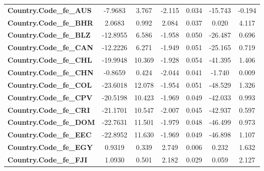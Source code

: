 \begin{center}
\begin{tabular}{lcccccc}
\textbf{Country.Code\_fe\_AUS}                            &      -7.9683  &        3.767     &    -2.115  &         0.034        &      -15.743    &       -0.194     \\
\textbf{Country.Code\_fe\_BHR}                            &       2.0683  &        0.992     &     2.084  &         0.037        &        0.020    &        4.117     \\
\textbf{Country.Code\_fe\_BLZ}                            &     -12.8955  &        6.586     &    -1.958  &         0.050        &      -26.487    &        0.696     \\
\textbf{Country.Code\_fe\_CAN}                            &     -12.2226  &        6.271     &    -1.949  &         0.051        &      -25.165    &        0.719     \\
\textbf{Country.Code\_fe\_CHL}                            &     -19.9948  &       10.369     &    -1.928  &         0.054        &      -41.395    &        1.406     \\
\textbf{Country.Code\_fe\_CHN}                            &      -0.8659  &        0.424     &    -2.044  &         0.041        &       -1.740    &        0.009     \\
\textbf{Country.Code\_fe\_COL}                            &     -23.6018  &       12.078     &    -1.954  &         0.051        &      -48.529    &        1.326     \\
\textbf{Country.Code\_fe\_CPV}                            &     -20.5198  &       10.423     &    -1.969  &         0.049        &      -42.033    &        0.993     \\
\textbf{Country.Code\_fe\_CRI}                            &     -21.1701  &       10.547     &    -2.007  &         0.045        &      -42.937    &        0.597     \\
\textbf{Country.Code\_fe\_DOM}                            &     -22.7631  &       11.501     &    -1.979  &         0.048        &      -46.499    &        0.973     \\
\textbf{Country.Code\_fe\_EEC}                            &     -22.8952  &       11.630     &    -1.969  &         0.049        &      -46.898    &        1.107     \\
\textbf{Country.Code\_fe\_EGY}                            &       0.9319  &        0.339     &     2.749  &         0.006        &        0.232    &        1.632     \\
\textbf{Country.Code\_fe\_FJI}                            &       1.0930  &        0.501     &     2.182  &         0.029        &        0.059    &        2.127     \\

\end{tabular}
\end{center}
